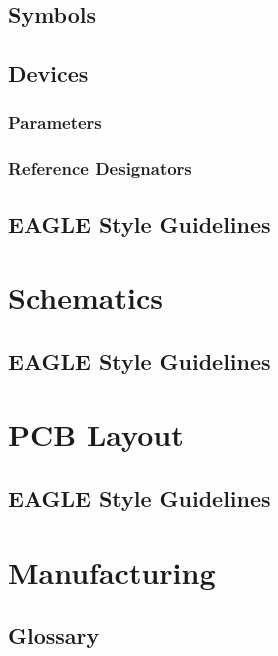 \documentclass[12pt,article]{memoir}
\begin{document}
\section{Symbols}

\section{Devices}

\subsection{Parameters}

\subsection{Reference Designators}

\section{EAGLE Style Guidelines}

\newpage

\chapter{Schematics}

\section{EAGLE Style Guidelines}

\newpage

\chapter{PCB Layout}

\section{EAGLE Style Guidelines}

\newpage

\chapter{Manufacturing}

\begin{appendix}

\chapter{Glossary}

\end{appendix}
\end{document}
